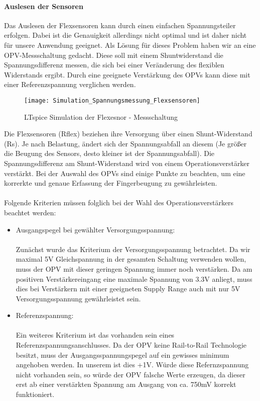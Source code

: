 \documentclass[titlepage,12pt,twoside]{article}
\begin{document}
\paragraph{Auslesen der Sensoren}
\hfill \break
\hfill \break
Das Auslesen der Flexsensoren kann durch einen einfachen Spannungsteiler erfolgen. Dabei ist die Genauigkeit
allerdings nicht optimal und ist daher nicht für unsere Anwendung geeignet. Als Lösung für dieses Problem haben wir an eine 
OPV-Messschaltung gedacht. Diese soll mit einem Shuntwiderstand die Spannungsdifferenz messen, die sich bei einer Veränderung 
des flexiblen Widerstands ergibt. Durch eine geeignete Verstärkung des OPVs kann diese mit einer Referenzspannung verglichen 
werden. \\
\begin{figure}[H]
	\begin{center}
		\scalebox{1.25}
		{\texttt{[image: Simulation\_Spannungsmessung\_Flexsensoren]}}
		\caption{LTspice Simulation der Flexesnor - Messschaltung}
		\label{fig:Simulation_Spannungsmessung_Flexsensoren}		
	\end{center}
\end{figure}
\hfill \break
Die Flexsensoren (Rflex) beziehen ihre Versorgung über einen Shunt-Widerstand (Rs). Je nach Belastung, ändert sich der 
Spannungsabfall an diesem (Je größer die Beugung des Sensors, desto kleiner ist der Spannungsabfall). Die Spannungsdifferenz 
am Shunt-Widerstand wird von einem Operationsverstärker verstärkt. Bei der Auswahl des OPVs sind einige Punkte zu beachten, um 
eine korrerkte und genaue Erfassung der Fingerbeugung zu gewährleisten. \\
\\
Folgende Kriterien müssen folglich bei der Wahl des Operationsverstärkers beachtet werden:
\begin{itemize}
	\item Ausgangspegel bei gewählter Versorgungsspannung: \\
		  \\
		  Zunächst wurde das Kriterium der Versorgungsspannung betrachtet. Da wir maximal 5V Gleichspannung in der gesamten 
		  Schaltung verwenden wollen, muss der OPV mit dieser geringen Spannung immer noch verstärken. Da am positiven 
		  Verstärkereingang eine maximale Spannung von 3.3V anliegt, muss dies bei Verstärkern mit einer geeigneten Supply Range 
		  auch mit nur 5V Versorgungsspannung gewährleistet sein.
	\item Referenzspannung: \\
		  \\
		  Ein weiteres Kriterium ist das vorhanden sein eines Referenzspannungsanschlusses. Da der OPV keine Rail-to-Rail 
		  Technologie besitzt, muss der Ausgangsspannungspegel auf ein gewisses minimum angehoben werden. In unserem ist dies 
		  +1V. Würde diese Refernzspannung nicht vorhanden sein, so würde der OPV falsche Werte erzeugen, da dieser erst ab einer
		  verstärkten Spannung am Ausgang von ca. 750mV korrekt funktioniert.

\end{itemize}
\end{document}
